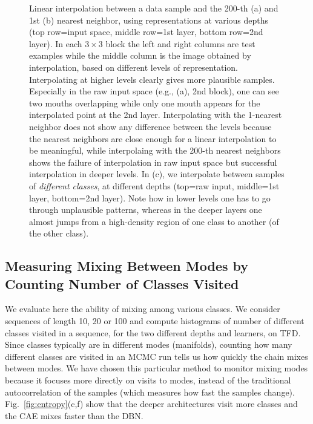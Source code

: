 \begin{figure}
\caption{ Linear interpolation between a data sample and the 200-th (a)
and 1st (b) nearest neighbor, using representations 
at various depths (top row=input space, middle row=1st layer,
bottom row=2nd layer).  In each $3\times3$ block the left and right columns are
test examples while the middle column is the image obtained by interpolation, based on
different levels of representation.
Interpolating at higher levels clearly gives more plausible samples. Especially in
the raw input space (e.g., (a), 2nd block), one can see two mouths overlapping while only one mouth appears
for the interpolated point at the 2nd layer. Interpolating with the 1-nearest neighbor
does not show any difference between the levels because the nearest neighbors are close enough
for a linear interpolation to be meaningful, while interpolaing with the 200-th nearest
neighbors shows the failure of interpolation in raw input space but successful
interpolation in deeper levels. In (c), we interpolate between samples
of {\em different classes}, at different depths (top=raw input, middle=1st layer, bottom=2nd layer).
Note how in lower levels one has to go through unplausible patterns, whereas in the deeper
layers one almost jumps from a high-density region of one class to another (of the other class).}
\label{fig:interpol}
\end{figure}




\vspace*{-1mm}
\subsection{Measuring Mixing Between Modes by Counting Number of Classes Visited}
\label{sec:mix-time}
\vspace*{-1mm}

We evaluate here the ability of mixing among various classes. We consider sequences
of length 10, 20 or 100 and compute histograms of number of different classes visited
in a sequence, for the two different depths and learners, on TFD. Since classes
typically are in different modes (manifolds), counting how many different classes
are visited in an MCMC run tells us how quickly the chain mixes between modes.
We have chosen this particular method to monitor mixing modes because it focuses more
directly on visits to modes, instead of the traditional autocorrelation of the
samples (which measures how fast the samples change).
Fig.~\ref{fig:entropy}(c,f) show that the deeper architectures visit more classes
and the CAE mixes faster than the DBN. 

